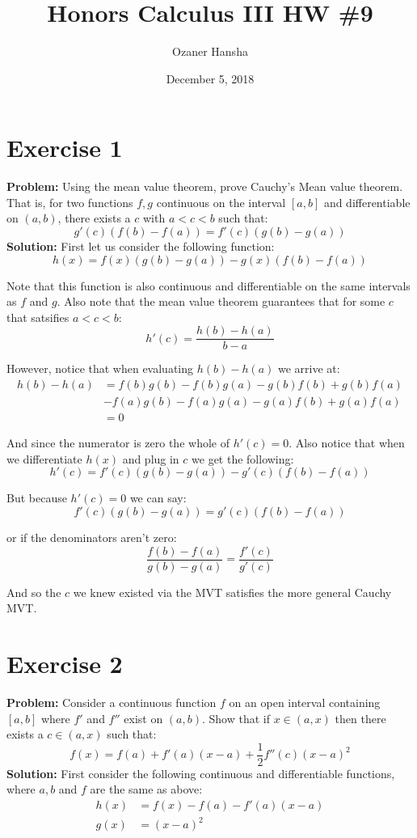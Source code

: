 \documentclass{article}
\begin{document}
\title{Honors Calculus III HW \#9}
\author{Ozaner Hansha}
\date{December 5, 2018}
\maketitle

\section*{Exercise 1}
\textbf{Problem:} Using the mean value theorem, prove Cauchy's Mean value theorem. That is, for two functions $f,g$ continuous on the interval $[a,b]$ and differentiable on $(a,b)$, there exists a $c$ with $a<c<b$ such that:
$$g'(c)(f(b)-f(a))=f'(c)(g(b)-g(a))$$
\textbf{Solution:} First let us consider the following function:
$$h(x)=f(x)(g(b)-g(a))-g(x)(f(b)-f(a))$$

Note that this function is also continuous and differentiable on the same intervals as $f$ and $g$. Also note that the mean value theorem guarantees that for some $c$ that satsifies $a<c<b$:
$$h'(c)=\frac{h(b)-h(a)}{b-a} $$

However, notice that when evaluating $h(b)-h(a)$ we arrive at:
\begin{align*}
  h(b)-h(a)&=f(b)g(b)-f(b)g(a)-g(b)f(b)+g(b)f(a)\\
  &-f(a)g(b)-f(a)g(a)-g(a)f(b)+g(a)f(a)\\
  &=0
\end{align*}

And since the numerator is zero the whole of $h'(c)=0$. Also notice that when we differentiate $h(x)$ and plug in $c$ we get the following:
$$h'(c)=f'(c)(g(b)-g(a))-g'(c)(f(b)-f(a))$$

But because $h'(c)=0$ we can say:
$$f'(c)(g(b)-g(a))=g'(c)(f(b)-f(a))$$

or if the denominators aren't zero:
$$\frac{f(b)-f(a)}{g(b)-g(a)}=\frac{f'(c)}{g'(c)}$$

And so the $c$ we knew existed via the MVT satisfies the more general Cauchy MVT.

\section*{Exercise 2}
\textbf{Problem:} Consider a continuous function $f$ on an open interval containing $[a,b]$ where $f'$ and $f''$ exist on $(a,b)$. Show that if $x\in(a,x)$ then there exists a $c\in(a,x)$ such that:
$$f(x)=f(a)+f'(a)(x-a)+\frac{1}{2}f''(c)(x-a)^2$$
\textbf{Solution:} First consider the following continuous and differentiable functions, where $a,b$ and $f$ are the same as above:
\begin{align*}
  h(x)&=f(x)-f(a)-f'(a)(x-a)\\
  g(x)&=(x-a)^2
\end{align*}
\end{document}
